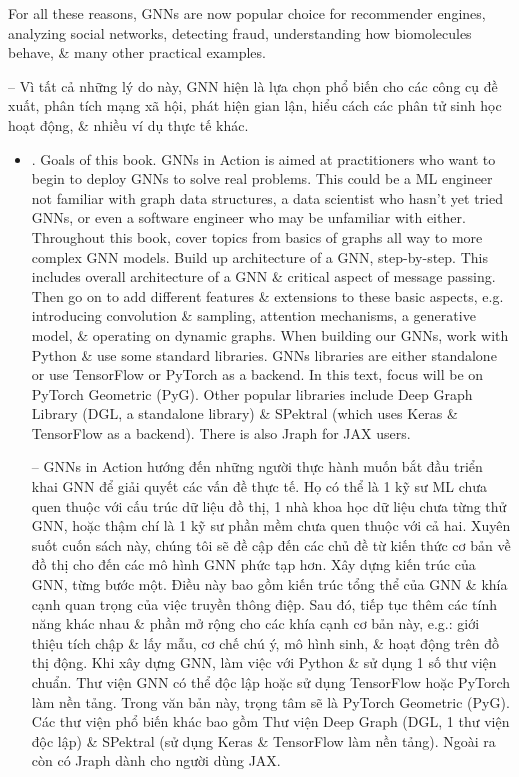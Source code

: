 \documentclass{article}
\begin{document}
\begin{itemize}
    For all these reasons, GNNs are now popular choice for recommender engines, analyzing social networks, detecting fraud, understanding how biomolecules behave, \& many other practical examples.

    -- Vì tất cả những lý do này, GNN hiện là lựa chọn phổ biến cho các công cụ đề xuất, phân tích mạng xã hội, phát hiện gian lận, hiểu cách các phân tử sinh học hoạt động, \& nhiều ví dụ thực tế khác.
    \begin{itemize}
        \item {. Goals of this book.} GNNs in Action is aimed at practitioners who want to begin to deploy GNNs to solve real problems. This could be a ML engineer not familiar with graph data structures, a data scientist who hasn't yet tried GNNs, or even a software engineer who may be unfamiliar with either. Throughout this book, cover topics from basics of graphs all way to more complex GNN models. Build up architecture of a GNN, step-by-step. This includes overall architecture of a GNN \& critical aspect of message passing. Then go on to add different features \& extensions to these basic aspects, e.g. introducing convolution \& sampling, attention mechanisms, a generative model, \& operating on dynamic graphs. When building our GNNs, work with Python \& use some standard libraries. GNNs libraries are either standalone or use TensorFlow or PyTorch as a backend. In this text, focus will be on PyTorch Geometric (PyG). Other popular libraries include Deep Graph Library (DGL, a standalone library) \& SPektral (which uses Keras \& TensorFlow as a backend). There is also Jraph for JAX users.

        -- GNNs in Action hướng đến những người thực hành muốn bắt đầu triển khai GNN để giải quyết các vấn đề thực tế. Họ có thể là 1 kỹ sư ML chưa quen thuộc với cấu trúc dữ liệu đồ thị, 1 nhà khoa học dữ liệu chưa từng thử GNN, hoặc thậm chí là 1 kỹ sư phần mềm chưa quen thuộc với cả hai. Xuyên suốt cuốn sách này, chúng tôi sẽ đề cập đến các chủ đề từ kiến thức cơ bản về đồ thị cho đến các mô hình GNN phức tạp hơn. Xây dựng kiến trúc của GNN, từng bước một. Điều này bao gồm kiến trúc tổng thể của GNN \& khía cạnh quan trọng của việc truyền thông điệp. Sau đó, tiếp tục thêm các tính năng khác nhau \& phần mở rộng cho các khía cạnh cơ bản này, e.g.: giới thiệu tích chập \& lấy mẫu, cơ chế chú ý, mô hình sinh, \& hoạt động trên đồ thị động. Khi xây dựng GNN, làm việc với Python \& sử dụng 1 số thư viện chuẩn. Thư viện GNN có thể độc lập hoặc sử dụng TensorFlow hoặc PyTorch làm nền tảng. Trong văn bản này, trọng tâm sẽ là PyTorch Geometric (PyG). Các thư viện phổ biến khác bao gồm Thư viện Deep Graph (DGL, 1 thư viện độc lập) \& SPektral (sử dụng Keras \& TensorFlow làm nền tảng). Ngoài ra còn có Jraph dành cho người dùng JAX.


\end{itemize}
\end{itemize}
\end{document}
